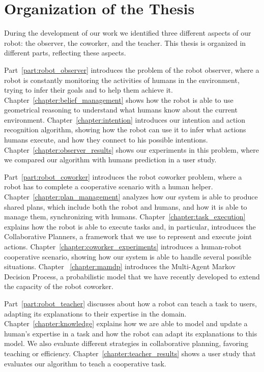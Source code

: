 \section{Organization of the Thesis}
During the development of our work we identified three different aspects of our robot: the observer, the coworker, and the teacher. This thesis is organized in different parts, reflecting these aspects.

Part~\ref{part:robot_observer} introduces the problem of the robot observer, where a robot is constantly monitoring the activities of humans in the environment, trying to infer their goals and to help them achieve it.  Chapter~\ref{chapter:belief_management} shows how the robot is able to use geometrical reasoning to understand what humans know about the current environment. Chapter~\ref{chapter:intention} introduces our intention and action recognition algorithm, showing how the robot can use it to infer what actions humans execute, and how they connect to his possible intentions. Chapter~\ref{chapter:observer_results} shows our experiments in this problem, where we compared our algorithm with humans prediction in a user study.

Part~\ref{part:robot_coworker} introduces the robot coworker problem, where a robot has to complete a cooperative scenario with a human helper. Chapter~\ref{chapter:plan_management} analyzes how our system is able to produce shared plans, which include both the robot and humans, and how it is able to manage them, synchronizing with humans. Chapter~\ref{chapter:task_execution} explains how the robot is able to execute tasks and, in particular, introduces the Collaborative Planners, a framework that we use to represent and execute joint actions. Chapter~\ref{chapter:coworker_experiments} introduces a human-robot cooperative scenario, showing how our system is able to handle several possible situations. Chapter ~\ref{chapter:mamdp} introduces the Multi-Agent Markov Decision Process, a probabilistic model that we have recently developed to extend the capacity of the robot coworker.

Part~\ref{part:robot_teacher} discusses about how a robot can teach a task to users, adapting its explanations to their expertise in the domain. Chapter~\ref{chapter:knowledge} explains how we are able to model and update a human's expertise in a task and how the robot can adapt its explanations to this model. We also evaluate different strategies in collaborative planning, favoring teaching or efficiency. Chapter~\ref{chapter:teacher_results} shows a user study that evaluates our algorithm to teach a cooperative task.

